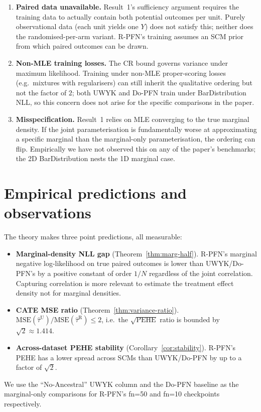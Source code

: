 \documentclass[11pt]{article}
\theoremstyle{remark}
\begin{document}
\begin{enumerate}
  \item \textbf{Paired data unavailable.} Result~1's sufficiency
    argument requires the training data to actually contain both
    potential outcomes per unit. Purely observational data (each unit
    yields one $Y$) does not satisfy this; neither does the
    randomised-per-arm variant. R-PFN's training assumes an SCM prior
    from which paired outcomes can be drawn.
  \item \textbf{Non-MLE training losses.} The CR bound governs
    variance under maximum likelihood. Training under non-MLE
    proper-scoring losses (e.g.\ mixtures with regularisers) can still
    inherit the qualitative ordering but not the factor of $2$;
    both UWYK and Do-PFN train under BarDistribution NLL, so this
    concern does not arise for the specific comparisons in the paper.
  \item \textbf{Misspecification.} Result~1 relies on MLE
    converging to the true marginal density. If the joint
    parameterisation is fundamentally worse at approximating a specific
    marginal than the marginal-only parameterisation, the ordering can
    flip. Empirically we have not observed this on any of the paper's
    benchmarks; the 2D BarDistribution nests the 1D marginal case.
\end{enumerate}

\section{Empirical predictions and observations}
\label{sec:empirical-tests}

The theory makes three point predictions, all measurable:
\begin{itemize}
  \item \textbf{Marginal-density NLL gap} (Theorem~\ref{thm:marg-half}).
    R-PFN's marginal negative log-likelihood on true paired outcomes
    is lower than UWYK/Do-PFN's by a positive constant of order
    $1/N$ regardless of the joint correlation. Capturing correlation is more relevant to estimate the treatment effect density not for marginal densities.
  \item \textbf{CATE MSE ratio} (Theorem~\ref{thm:variance-ratio}).
    $\mathrm{MSE}(\hat\tau^{\mathrm{U}}) / \mathrm{MSE}(\hat\tau^{\mathrm{R}})
    \leq 2$, i.e.\ the $\sqrt{\mathrm{PEHE}}$ ratio is bounded by
    $\sqrt{2} \approx 1.414$.
  \item \textbf{Across-dataset PEHE stability} (Corollary~\ref{cor:stability}).
    R-PFN's PEHE has a lower spread across SCMs than UWYK/Do-PFN by up
    to a factor of $\sqrt{2}$.
\end{itemize}
We use the ``No-Ancestral'' UWYK column and the Do-PFN baseline as the marginal-only comparisons for R-PFN's fn=50 and fn=10 checkpoints respectively.
\end{document}
